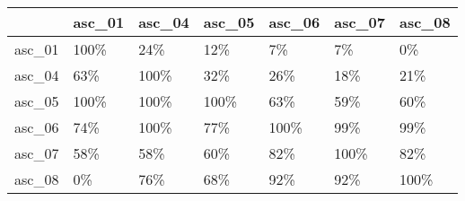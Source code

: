 \begin{tabular}{lllllll}
\toprule
{} & asc\_01 & asc\_04 & asc\_05 & asc\_06 & asc\_07 & asc\_08 \\
\midrule
asc\_01 &   100\% &    24\% &    12\% &     7\% &     7\% &     0\% \\
asc\_04 &    63\% &   100\% &    32\% &    26\% &    18\% &    21\% \\
asc\_05 &   100\% &   100\% &   100\% &    63\% &    59\% &    60\% \\
asc\_06 &    74\% &   100\% &    77\% &   100\% &    99\% &    99\% \\
asc\_07 &    58\% &    58\% &    60\% &    82\% &   100\% &    82\% \\
asc\_08 &     0\% &    76\% &    68\% &    92\% &    92\% &   100\% \\
\bottomrule
\end{tabular}
